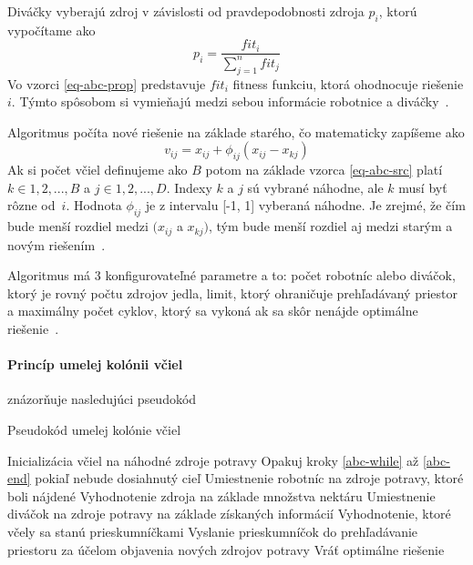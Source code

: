 \documentclass[a4paper,slovak,12pt,appendix]{article}
\begin{document}
Diváčky vyberajú zdroj v závislosti od pravdepodobnosti zdroja $p_i$,
ktorú vypočítame ako
\begin{equation}
  p_i = \frac{fit_i}{\sum_{j = 1}^{n} fit_j}
  \label{eq-abc-prop}
\end{equation}
Vo vzorci \ref{eq-abc-prop} predstavuje $fit_i$ fitness funkciu, ktorá
ohodnocuje riešenie $i$. Týmto spôsobom si vymieňajú medzi sebou informácie
robotnice a diváčky~\cite{Karaboga2007}.

Algoritmus počíta nové riešenie na základe starého, čo matematicky zapíšeme ako
\begin{equation}
  v_{ij} = x_{ij} + \phi_{ij} (x_{ij} - x_{kj})
  \label{eq-abc-src}
\end{equation}
Ak si počet včiel definujeme ako $B$ potom na základe vzorca \ref{eq-abc-src}
platí $k \in {1, 2, ..., B}$ a $j \in {1, 2, ..., D}$. Indexy $k$ a $j$ sú
vybrané náhodne, ale $k$ musí byť rôzne od $i$. Hodnota $\phi_{ij}$ je
z intervalu [-1, 1] vyberaná náhodne. Je zrejmé, že čím bude menší rozdiel
medzi $(x_{ij}$ a $x_{kj})$, tým bude menší rozdiel aj medzi starým a novým
riešením~\cite{Karaboga2007}.

Algoritmus má 3 konfigurovateľné parametre a to: počet robotníc alebo diváčok,
ktorý je rovný počtu zdrojov jedla, limit, ktorý ohraničuje prehľadávaný
priestor a maximálny počet cyklov, ktorý sa vykoná ak sa skôr nenájde
optimálne riešenie~\cite{Karaboga2007}.

\paragraph{Princíp umelej kolónii včiel} znázorňuje nasledujúci
pseudokód~\cite{Karaboga2007}
\begin{algorithm}[H]
  \caption{Pseudokód umelej kolónie včiel}
  \begin{algorithmic}[1]
    \State Inicializácia včiel na náhodné zdroje potravy
    \State Opakuj kroky \ref{abc-while} až \ref{abc-end} pokiaľ nebude dosiahnutý cieľ \label{abc-while}
    \State Umiestnenie robotníc na zdroje potravy, ktoré boli nájdené
    \State Vyhodnotenie zdroja na základe množstva nektáru
    \State Umiestnenie diváčok na zdroje potravy na základe získaných informácií
    \State Vyhodnotenie, ktoré včely sa stanú prieskumníčkami
    \State Vyslanie prieskumníčok do prehľadávanie priestoru za účelom objavenia nových zdrojov potravy \label{abc-end}
    \State Vráť optimálne riešenie
  \end{algorithmic}
\end{algorithm}
\end{document}
